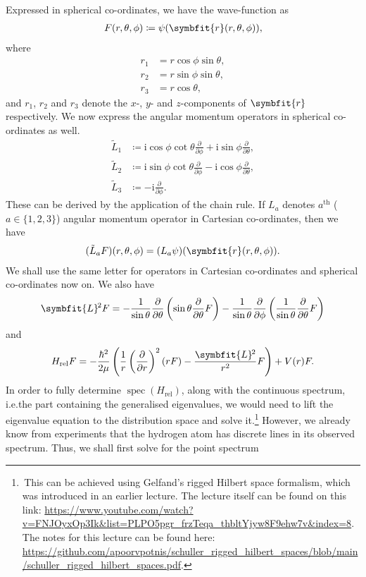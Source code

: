 \documentclass[12pt, a4 paper]{article}
\theoremstyle{definition}
\renewcommand{\i}{\mathrm{i}}
\DeclareMathOperator{\spec}{spec}
\newcommand{\rvec}{\symbfit{r}}
\newcommand{\angsone}{\tilde{L}_1}
\newcommand{\angstwo}{\tilde{L}_2}
\newcommand{\angsthree}{\tilde{L}_3}
\newcommand{\lvecsquare}{\symbfit{L}\kern-1pt^2}
\begin{document}
	Expressed in spherical co-ordinates, we have the wave-function as
	\begin{align*}
	    F(r, \theta, \phi) \coloneq \psi(\rvec(r, \theta, \phi)),
	\end{align*}
	where
	\begin{align*}
		r_1 &= r \cos{\phi} \sin{\theta},\\
		r_2 &= r \sin{\phi} \sin{\theta},\\
		r_3 &= r \cos{\theta},
	\end{align*}
	and $r_1$, $r_2$ and $r_3$ denote the $x$-, $y$- and $z$-components of $\rvec$ respectively. We now express the angular momentum operators in spherical co-ordinates as well.
	\begin{align*}
		\angsone &\coloneq \i \cos{\phi}\cot{\theta}\frac{\partial}{\partial\phi} + \i \sin{\phi}\frac{\partial}{\partial\theta},\\
		\angstwo &\coloneq \i \sin{\phi}\cot{\theta}\frac{\partial}{\partial\phi} - \i \cos{\phi}\frac{\partial}{\partial\theta},\\
		\angsthree &\coloneq -\i \frac{\partial}{\partial\phi}.
	\end{align*}
	These can be derived by the application of the chain rule. If $L_a$ denotes $a^{\text{th}}$ ($a \in \{1,2,3\}$) angular momentum operator in Cartesian co-ordinates, then we have
	\begin{align*}
		(\tilde{L}_a F) (r, \theta, \phi) = (L_a \psi)(\rvec(r, \theta, \phi)).
	\end{align*}
	We shall use the same letter for operators in Cartesian co-ordinates and spherical co-ordinates now on. We also have
	\begin{align*}
		\lvecsquare F = -\frac{1}{\sin{\theta}}\frac{\partial}{\partial \theta}\left(\sin{\theta}\frac{\partial}{\partial\theta}F\right) -\frac{1}{\sin{\theta}}\frac{\partial}{\partial\phi}\left(\frac{1}{\sin{\theta}}\frac{\partial}{\partial\theta}F\right)
	\end{align*}
	and
	\begin{align*}
		H_\text{rel} F = -\frac{\hbar^2}{2\mu}\left(\frac{1}{r}\left(\frac{\partial}{\partial r}\right)^2 (rF) - \frac{\lvecsquare}{r^2}F\right) + V(r)F.
	\end{align*}
	In order to fully determine $\spec(H_\text{rel})$, along with the continuous spectrum, i.e.\@ the part containing the generalised eigenvalues, we would need to lift the eigenvalue equation to the distribution space and solve it.\footnote{\,This can be achieved using Gelfand's rigged Hilbert space formalism, which was introduced in an earlier lecture. The lecture itself can be found on this link: \url{https://www.youtube.com/watch?v=FNJOyxOp3Ik&list=PLPO5pgr_frzTeqa_thbltYjyw8F9ehw7v&index=8}. The notes for this lecture can be found here: \url{https://github.com/apoorvpotnis/schuller_rigged_hilbert_spaces/blob/main/schuller_rigged_hilbert_spaces.pdf}.} However, we already know from experiments that the hydrogen atom has discrete lines in its observed spectrum. Thus, we shall first solve for the point spectrum
\end{document}
